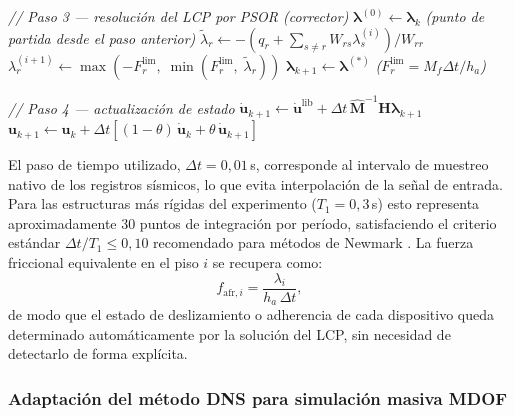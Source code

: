 \documentclass[preprint,12pt,authoryear]{elsarticle}
\newcommand{\Mf}{M_{\!f}}
\newcommand{\ha}{h_a}
\begin{document}
\begin{algorithm}[t]
\begin{algorithmic}[1]
    \vspace{2pt}
    \State \textit{// Paso 3 — resolución del LCP por PSOR (corrector)}
    \State $\bm{\lambda}^{(0)} \leftarrow \bm{\lambda}_k$
           \quad\textit{(punto de partida desde el paso anterior)}
            \State $\tilde{\lambda}_r \leftarrow
                   -\!\left(q_r + \sum_{s \neq r} W_{rs}\lambda_s^{(i)}\right)\!\big/W_{rr}$
            \State $\lambda_r^{(i+1)} \leftarrow
                   \max\!\left(-F^{\lim}_r,\;\min\!\left(F^{\lim}_r,\;\tilde{\lambda}_r\right)\right)$
        \EndFor
    \EndWhile
    \State $\bm{\lambda}_{k+1} \leftarrow \bm{\lambda}^{(*)}$
           \quad\textit{($F^{\lim}_r = \Mf\Delta t/\ha$)}

    \vspace{2pt}
    \State \textit{// Paso 4 — actualización de estado}
    \State $\dot{\bm{u}}_{k+1} \leftarrow
           \dot{\bm{u}}^{\mathrm{lib}} +
           \Delta t\,\hat{\bm{M}}^{-1}\bm{H}\bm{\lambda}_{k+1}$
    \State $\bm{u}_{k+1} \leftarrow \bm{u}_k +
           \Delta t\!\left[(1-\theta)\,\dot{\bm{u}}_k +
                           \theta\,\dot{\bm{u}}_{k+1}\right]$
\EndFor
\end{algorithmic}
\end{algorithm}

El paso de tiempo utilizado, $\Delta t = 0{,}01$\,s, corresponde al intervalo
de muestreo nativo de los registros sísmicos, lo que evita interpolación de
la señal de entrada. Para las estructuras más rígidas del experimento
($T_1 = 0{,}3$\,s) esto representa aproximadamente 30 puntos de integración
por período, satisfaciendo el criterio estándar $\Delta t / T_1 \leq 0{,}10$
recomendado para métodos de Newmark \citep{chopra_dynamics_2015}.
La fuerza friccional equivalente en el piso $i$ se recupera como:
\begin{equation}
    f_{\mathrm{afr},i} = \frac{\lambda_i}{\ha\,\Delta t},
    \label{eq:ffrict}
\end{equation}
de modo que el estado de deslizamiento o adherencia de cada dispositivo queda
determinado automáticamente por la solución del LCP, sin necesidad de
detectarlo de forma explícita.

\subsubsection*{Adaptación del método DNS para simulación masiva MDOF}
\label{sec:theory:nsd:adaptacion}
\end{document}
